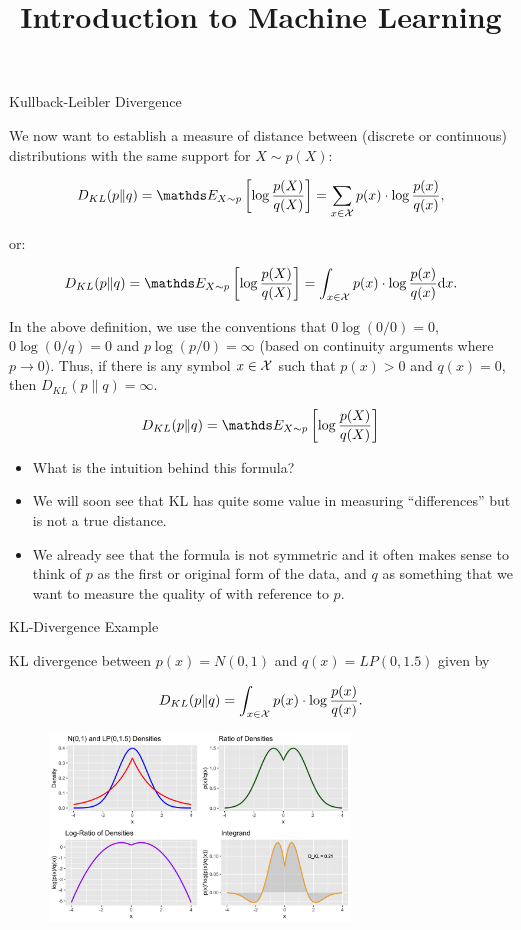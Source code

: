 \documentclass[11pt,compress,t,notes=noshow, xcolor=table]{beamer}
\title{Introduction to Machine Learning}
\date{}
\begin{document}


\begin{vbframe} {Kullback-Leibler Divergence}

We now want to establish a measure of distance between (discrete or continuous) distributions with the same support for $X \sim p(X)$:

  $$ D_{KL}(p \| q) = \E_{X \sim p} \left[\log \frac{p(X)}{q(X)}\right] = \sum_{x \in \Xspace} p(x) \cdot \log \frac{p(x)}{q(x)}, $$
  
  or: 
  
  $$ D_{KL}(p \| q) = \E_{X \sim p} \left[\log \frac{p(X)}{q(X)}\right] = \int_{x \in \Xspace} p(x) \cdot \log \frac{p(x)}{q(x)} \mathrm{d}x. $$

In the above definition, we use the conventions that $0 \log (0/0) = 0$, $0 \log (0/q) = 0$ and $p \log(p/0) = \infty$ (based on continuity arguments where $p \to 0$). 
Thus, if there is any symbol $x \in \mathcal{X}$ such that $p(x) > 0$ and $q(x) = 0$,
then $D_{KL}(p \| q) = \infty.$
  
\framebreak

$$ D_{KL}(p \| q) = \E_{X \sim p} \left[\log \frac{p(X)}{q(X)}\right] $$

\begin{itemize}
  \item  What is the intuition behind this formula?  
  \item  We will soon see that KL has quite some value in measuring \enquote{differences} but is not a true distance. 
  \item  We already see that the formula is not symmetric and it often makes sense to think of $p$ as the first or original form of the data,
    and $q$ as something that we want to measure the quality of with reference to $p$.
  \end{itemize}

\end{vbframe}

\begin{vbframe} {KL-Divergence Example}

KL divergence between $p(x)=N(0,1)$ and $q(x)=LP(0, 1.5)$ given by

  $$ D_{KL}(p \| q) = \int_{x \in \mathcal{X}} p(x) \cdot \log \frac{p(x)}{q(x)}. $$

\begin{figure}
\includegraphics[width = 8cm ]{figure/kl_calculation_plot_1.png} 
\end{figure}

\end{vbframe}
\end{document}
